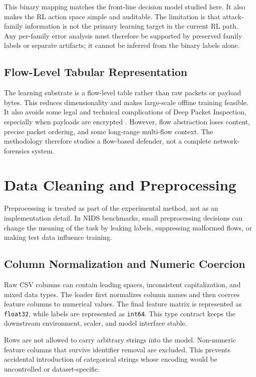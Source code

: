 This binary mapping matches the front-line decision model studied here. It also makes the RL action space simple and auditable. The limitation is that attack-family information is not the primary learning target in the current RL path. Any per-family error analysis must therefore be supported by preserved family labels or separate artifacts; it cannot be inferred from the binary labels alone.

\subsection{Flow-Level Tabular Representation}
The learning substrate is a flow-level table rather than raw packets or payload bytes. This reduces dimensionality and makes large-scale offline training feasible. It also avoids some legal and technical complications of Deep Packet Inspection, especially when payloads are encrypted \parencite{Sperotto2010FlowIDS,Umer2017FlowIDS}. However, flow abstraction loses content, precise packet ordering, and some long-range multi-flow context. The methodology therefore studies a flow-based defender, not a complete network-forensics system.

\section{Data Cleaning and Preprocessing}
Preprocessing is treated as part of the experimental method, not as an implementation detail. In NIDS benchmarks, small preprocessing decisions can change the meaning of the task by leaking labels, suppressing malformed flows, or making test data influence training.

\subsection{Column Normalization and Numeric Coercion}
Raw CSV columns can contain leading spaces, inconsistent capitalization, and mixed data types. The loader first normalizes column names and then coerces feature columns to numerical values. The final feature matrix is represented as \texttt{float32}, while labels are represented as \texttt{int64}. This type contract keeps the downstream environment, scaler, and model interface stable.

Rows are not allowed to carry arbitrary strings into the model. Non-numeric feature columns that survive identifier removal are excluded. This prevents accidental introduction of categorical strings whose encoding would be uncontrolled or dataset-specific.


